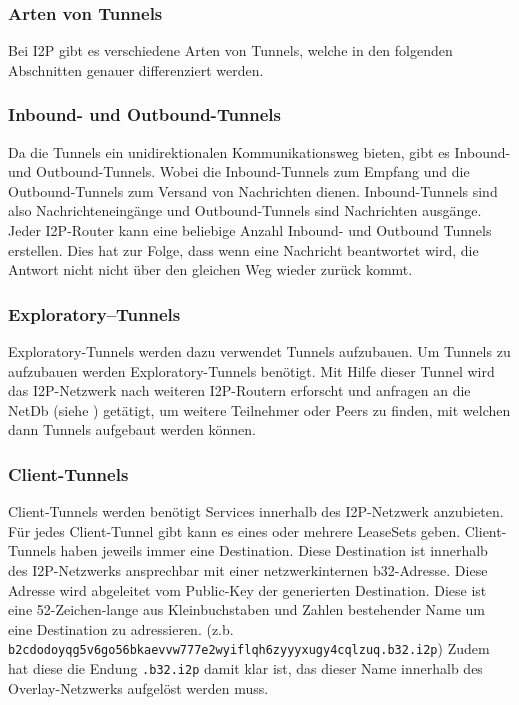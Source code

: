 \subsubsection{Arten von Tunnels}

Bei I2P gibt es verschiedene Arten von Tunnels, welche in den folgenden Abschnitten genauer differenziert werden.

\subsubsection{Inbound- und Outbound-Tunnels}
Da die Tunnels ein unidirektionalen Kommunikationsweg bieten, gibt es Inbound- und Outbound-Tunnels.
Wobei die Inbound-Tunnels zum Empfang und die Outbound-Tunnels zum Versand von Nachrichten dienen.
Inbound-Tunnels sind also Nachrichteneingänge und Outbound-Tunnels sind Nachrichten ausgänge.
Jeder I2P-Router kann eine beliebige Anzahl Inbound- und Outbound Tunnels erstellen.
Dies hat zur Folge, dass wenn eine Nachricht beantwortet wird, die Antwort nicht nicht über den gleichen Weg wieder zurück kommt.
\cite{noauthor_intro_nodate}

\subsubsection{Exploratory--Tunnels}

Exploratory-Tunnels werden dazu verwendet Tunnels aufzubauen.
Um Tunnels zu aufzubauen werden Exploratory-Tunnels benötigt.
Mit Hilfe dieser Tunnel wird das I2P-Netzwerk nach weiteren I2P-Routern erforscht und anfragen an die NetDb (siehe ) getätigt,
um weitere Teilnehmer oder Peers zu finden, mit welchen dann Tunnels aufgebaut werden können.
\cite{de_boer_invisible_2019}

\subsubsection{Client-Tunnels}

Client-Tunnels werden benötigt Services innerhalb des I2P-Netzwerk anzubieten.
Für jedes Client-Tunnel gibt kann es eines oder mehrere LeaseSets geben.
Client-Tunnels haben jeweils immer eine Destination.
Diese Destination ist innerhalb des I2P-Netzwerks ansprechbar mit einer netzwerkinternen b32-Adresse. 
Diese Adresse wird abgeleitet vom Public-Key der generierten Destination.
Diese ist eine 52-Zeichen-lange aus Kleinbuchstaben und Zahlen bestehender Name um eine Destination zu adressieren. (z.b. \lstinline|b2cdodoyqg5v6go56bkaevvw777e2wyiflqh6zyyyxugy4cqlzuq.b32.i2p|)
Zudem hat diese die Endung \lstinline|.b32.i2p| damit klar ist, das dieser Name innerhalb des Overlay-Netzwerks aufgelöst werden muss.

